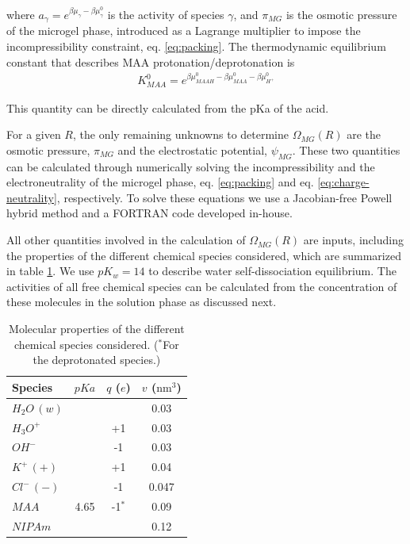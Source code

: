 \noindent where $a_\gamma = e^{\beta\mu_\gamma-\beta\mu_\gamma^0}$ is the activity of species $\gamma$, and $\pi_{MG}$ is the osmotic pressure of the microgel phase, introduced as a Lagrange multiplier to impose the incompressibility constraint, eq. \ref{eq:packing}.
The thermodynamic equilibrium constant that describes MAA protonation/deprotonation is
%
%
\begin{align}
K^0_{MAA}= e^{\beta\mu^0_{MAAH}-\beta\mu^0_{MAA}-\beta\mu^0_{H^+}}
\end{align}

\noindent This quantity can be directly calculated from the pKa of the acid.




For a given $R$, the only remaining unknowns to determine $\Omega_{MG}(R)$ are the osmotic pressure, $\pi_{MG}$ and the electrostatic potential, $\psi_{MG}$.
These two quantities can be calculated through numerically solving the incompressibility and the electroneutrality of the microgel phase, eq. \ref{eq:packing} and eq. \ref{eq:charge-neutrality}, respectively. 
To solve these equations we use a Jacobian-free Powell hybrid method and a FORTRAN code developed in-house.


All other quantities involved in the calculation of $\Omega_{MG}(R)$ are inputs, including the properties of the different chemical species considered, which are summarized in table \ref{table:molecules}.
We use $pK_w=14$ to describe water self-dissociation equilibrium.
The activities of all free chemical species can be calculated from the concentration of these molecules in the solution phase as discussed next.


\begin{table}
	\centering
\begin{tabular}{|lccc|}
    \hline
    {Species} & {$pKa$} & {$q$ ($e$)} & {$v$ ($\text{nm}^3$)} \\
      \hline
$H_2O\,(w)$ & ~ & ~ & 0.03\\
$H_3O^+$ & ~ & +1 & 0.03\\
$OH^-$ & ~ & -1 & 0.03\\
$K^+\,(+)$ & ~ & +1 & 0.04\\ 
$Cl^-\,(-)$ & ~ & -1 & 0.047\\
$MAA$ & 4.65 & -1$^\ast$ & 0.09\\
$NIPAm$ & ~ & ~ & 0.12\\
    \hline
  \end{tabular}
 \caption{Molecular properties of the different chemical species considered.
 \footnotesize ($^\ast$For the deprotonated species.)}
\label{table:molecules} 
\end{table}


